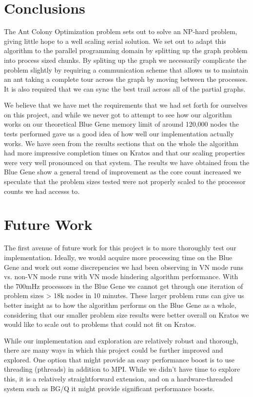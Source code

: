 \documentclass{acm_proc_article-sp}
\begin{document}
\section{Conclusions}
The Ant Colony Optimization problem sets out to solve an NP-hard problem, giving little hope to a well scaling serial solution. We set out to adapt this algorithm to the parallel programming domain by splitting up the graph problem into process sized chunks. By spliting up the graph we necessarily complicate the problem slightly by requiring a communication scheme that allows us to maintain an ant taking a complete tour across the graph by moving between the processes. It is also required that we can sync the best trail across all of the partial graphs. 

We believe that we have met the requirements that we had set forth for ourselves on this project, and while we never got to attempt to see how our algorithm works on our theoretical Blue Gene memory limit of around 120,000 nodes the tests performed gave us a good idea of how well our implementation actually works. We have seen from the results sections that on the whole the algorithm had more impressive completion times on Kratos and that our
scaling properties were very well pronounced on that system. The results we have obtained from the Blue Gene show a general trend of improvement as the core count increased we speculate that the problem sizes tested 
were not properly scaled to the processor counts we had accesss to.


\section{Future Work}
The first avenue of future work for this project is to more thoroughly test our implementation. Ideally, we would acquire more processing time on the Blue Gene and work out some discrepencies we had been observing in
VN mode runs vs. non-VN mode runs with VN mode hindering algorithm performance. With the 700mHz processors in the Blue Gene we cannot get through one iteration of problem sizes > 18k nodes in 10 minutes. These larger problem
runs can give us better insight as to how the algorithm performs on the Blue Gene as a whole, considering that our smaller problem size results were better overall on Kratos we would like to scale out to problems
that could not fit on Kratos.

While our implementation and exploration are relatively robust and thorough, there are many ways in
which this project could be further improved and explored. One option that might provide an easy performance
boost is to use threading (pthreads) in addition to MPI. While we didn't have time to explore this, it is a relatively
straightforward extension, and on a hardware-threaded system such as BG/Q it might provide significant
performance boosts.
\end{document}
